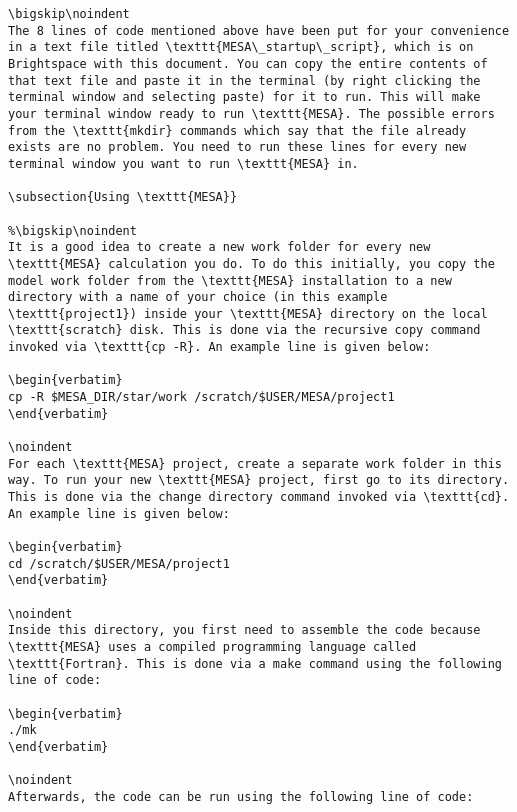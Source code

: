 \documentclass[11pt,a4paper]{article}
\begin{document}
\begin{lstlisting}
\bigskip\noindent
The 8 lines of code mentioned above have been put for your convenience in a text file titled \texttt{MESA\_startup\_script}, which is on Brightspace with this document. You can copy the entire contents of that text file and paste it in the terminal (by right clicking the terminal window and selecting paste) for it to run. This will make your terminal window ready to run \texttt{MESA}. The possible errors from the \texttt{mkdir} commands which say that the file already exists are no problem. You need to run these lines for every new terminal window you want to run \texttt{MESA} in.

\subsection{Using \texttt{MESA}}

%\bigskip\noindent
It is a good idea to create a new work folder for every new \texttt{MESA} calculation you do. To do this initially, you copy the model work folder from the \texttt{MESA} installation to a new directory with a name of your choice (in this example \texttt{project1}) inside your \texttt{MESA} directory on the local \texttt{scratch} disk. This is done via the recursive copy command invoked via \texttt{cp -R}. An example line is given below:

\begin{verbatim}
cp -R $MESA_DIR/star/work /scratch/$USER/MESA/project1
\end{verbatim}

\noindent
For each \texttt{MESA} project, create a separate work folder in this way. To run your new \texttt{MESA} project, first go to its directory. This is done via the change directory command invoked via \texttt{cd}. An example line is given below:

\begin{verbatim}
cd /scratch/$USER/MESA/project1
\end{verbatim}

\noindent
Inside this directory, you first need to assemble the code because \texttt{MESA} uses a compiled programming language called \texttt{Fortran}. This is done via a make command using the following line of code: 

\begin{verbatim}
./mk
\end{verbatim}

\noindent
Afterwards, the code can be run using the following line of code: 


\end{lstlisting}
\end{document}
